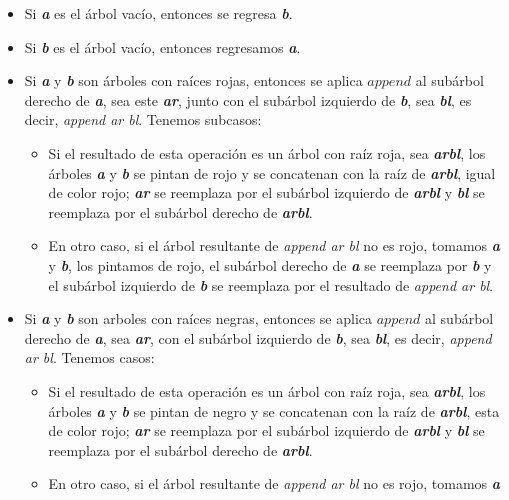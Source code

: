 \begin{itemize}
    \item Si \textbf{\textit{a}} es el \'arbol vacío, entonces se regresa \textbf{\textit{b}}.
    \item Si \textbf{\textit{b}} es el \'arbol vacío, entonces regresamos \textbf{\textit{a}}.
    \item Si \textbf{\textit{a}} y \textbf{\textit{b}} son \'arboles con raíces rojas, entonces se aplica $append$ al subárbol
    derecho de \textbf{\textit{a}}, sea este \textbf{\textit{ar}}, junto con el subárbol izquierdo de \textbf{\textit{b}}, sea \textbf{\textit{bl}}, es decir,
    \textit{append ar bl}. Tenemos subcasos:
    \begin{itemize}
      \item Si el resultado de esta operación es un árbol con raíz roja, sea \textbf{\textit{arbl}}, los \'arboles
      \textbf{\textit{a}} y \textbf{\textit{b}} se pintan de rojo y se concatenan con la raíz de \textbf{\textit{arbl}}, igual de color rojo; \textbf{\textit{ar}}
      se reemplaza por el subárbol izquierdo de \textbf{\textit{arbl}} y \textbf{\textit{bl}} se reemplaza por el subárbol derecho
      de \textbf{\textit{arbl}}.
      \item En otro caso, si el \'arbol resultante de \textit{append ar bl} no es rojo, tomamos \textbf{\textit{a}}
      y \textbf{\textit{b}}, los pintamos de rojo, el subárbol derecho de \textbf{\textit{a}} se reemplaza por \textbf{\textit{b}} y el subárbol
      izquierdo de \textbf{\textit{b}} se reemplaza por el resultado de \textit{append ar bl}.
    \end{itemize}
    \item Si \textbf{\textit{a}} y \textbf{\textit{b}} son arboles con raíces negras, entonces se aplica $append$ al subárbol
    derecho de \textbf{\textit{a}}, sea \textbf{\textit{ar}}, con el subárbol izquierdo de \textbf{\textit{b}}, sea \textbf{\textit{bl}}, es decir, \textit{append
    ar bl}. Tenemos casos:
    \begin{itemize}
      \item Si el resultado de esta operación es un árbol con raíz roja, sea \textbf{\textit{arbl}}, los \'arboles
      \textbf{\textit{a}} y \textbf{\textit{b}} se pintan de negro y se concatenan con la raíz de \textbf{\textit{arbl}}, esta de color rojo; \textbf{\textit{ar}}
      se reemplaza por el subárbol izquierdo de \textbf{\textit{arbl}} y \textbf{\textit{bl}} se reemplaza por el subárbol derecho
      de \textbf{\textit{arbl}}.
      \item En otro caso, si el \'arbol resultante de \textit{append ar bl} no es rojo, tomamos \textbf{\textit{a}}

\end{itemize}
\end{itemize}
